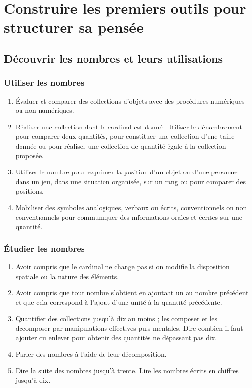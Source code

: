 \section{Construire les premiers outils pour structurer sa pensée}
\subsection{Découvrir les nombres et leurs utilisations}
\subsubsection{Utiliser les nombres}
\begin{enumerate}
\item Évaluer et comparer des collections d’objets avec des procédures numériques ou non numériques.
\item Réaliser une collection dont le cardinal est donné. Utiliser le dénombrement pour comparer deux quantités, pour constituer une collection d’une taille donnée ou pour réaliser une collection de quantité égale à la collection proposée.
\item Utiliser le nombre pour exprimer la position d’un objet ou d’une personne dans un jeu, dans une situation organisée, sur un rang ou pour comparer des positions.
\item Mobiliser des symboles analogiques, verbaux ou écrits, conventionnels ou non conventionnels pour communiquer des informations orales et écrites sur une quantité. 
\end{enumerate}

\subsubsection{Étudier les nombres}
\begin{enumerate}
\item Avoir compris que le cardinal ne change pas si on modifie la disposition spatiale ou la nature des éléments.
\item Avoir compris que tout nombre s’obtient en ajoutant un au nombre précédent et que cela correspond à l’ajout d’une unité à la quantité précédente.
\item Quantifier des collections jusqu’à dix au moins ; les composer et les décomposer par manipulations effectives puis mentales. Dire combien il faut ajouter ou enlever pour obtenir des quantités ne dépassant pas dix.
\item Parler des nombres à l’aide de leur décomposition. 
\item Dire la suite des nombres jusqu’à trente. Lire les nombres écrits en chiffres jusqu’à dix.
\end{enumerate}

